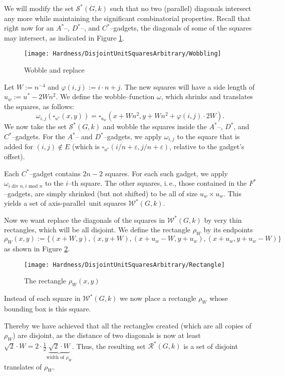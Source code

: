 \documentclass[12pt]{article}
\newcommand{\eps}{\varepsilon}
\newcommand{\ap}{a.p.\ }
\renewcommand{\ap}{axis-parallel\ }
\newcommand{\calS}{\mathcal{S}}
\newcommand{\calR}{\mathcal{R}}
\newcommand{\calW}{\mathcal{W}}
\begin{document}
We will modify the set $\calS^*(G, k)$ such that no two (parallel) diagonals intersect any more while maintaining the significant combinatorial properties. Recall that right now for an $A^*$--, $D^*$--, and $C^*$--gadgets, the diagonals of some of the squares may intersect, as indicated in Figure \ref{fig:Wobbling}.
\begin{figure}[ht]
	\centering
		\texttt{[image: Hardness/DisjointUnitSquaresArbitrary/Wobbling]}
	\caption{Wobble and replace}
	\label{fig:Wobbling}
\end{figure}


Let $W := n^{-4}$ and $\varphi(i, j) := i \cdot n + j$. The new squares will have a side length of $u_w := u^* - 2Wn^2$. We define the wobble--function $\omega$, which shrinks and translates the squares, as follows:
\[ \omega_{i, j}\left(\square_{u^*}(x, y)\right) = \square_{u_w}(x + Wn^2, y + Wn^2 + \varphi(i,j)\cdot 2W). \]
We now take the set $\calS^*(G, k)$ and wobble the squares inside the $A^*$--, $D^*$, and $C^*$--gadgets. For the $A^*$-- and $D^*$--gadgets, we apply $\omega_{i, j}$ to the square that is added for $(i, j) \notin E$ (which is $\square_{u^*}(i/n + \eps, j/n + \eps)$, relative to the gadget's offset).

Each $C^*$--gadget contains $2n - 2$ squares. For each such gadget, we apply $\omega_{i\text{ div }n, i \text{ mod } n}$ to the $i$--th square.
The other squares, i.\,e., those contained in the $F^*$--gadgets, are simply shrinked (but not shifted) to be all of size $u_w \times u_w$. This yields a set of \ap unit squares $\calW^*(G, k)$.

Now we want replace the diagonals of the squares in $\calW^*(G, k)$ by very thin rectangles, which will be all disjoint. We define the rectangle $\rho_W$ by its endpoints
\[ \rho_W(x, y) := \{ (x + W, y), (x, y + W), (x + u_w - W, y + u_w), (x + u_w, y + u_w - W) \}\]
as shown in Figure \ref{fig:Rectangle}.
\begin{figure}[ht]
	\centering
		\texttt{[image: Hardness/DisjointUnitSquaresArbitrary/Rectangle]}
	\caption{The rectangle $\rho_W(x, y)$}
	\label{fig:Rectangle}
\end{figure}
Instead of each square in $\calW^*(G, k)$ we now place a rectangle $\rho_W$ whose bounding box is this square.

Thereby we have achieved that all the rectangles created (which are all copies of $\rho_W$) are disjoint, as the distance of two diagonals is now at least $\sqrt 2 \cdot W = 2 \cdot \frac{1}{2} \underbrace{\sqrt 2 \cdot W}_{\text{width of } \rho_W}$. Thus, the resulting set $\calR^*(G, k)$ is a set of disjoint translates of $\rho_W$.
\end{document}
